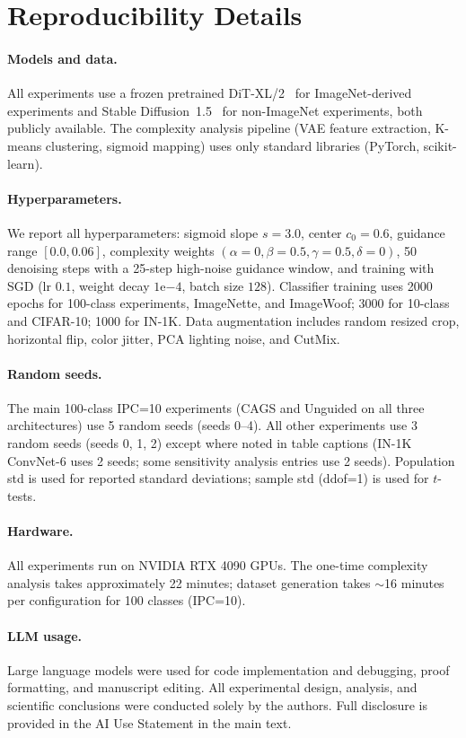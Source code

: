 \section{Reproducibility Details}
\label{sec:reproducibility}

\paragraph{Models and data.}
All experiments use a frozen pretrained DiT-XL/2~\cite{peebles2022scalable} for ImageNet-derived experiments and Stable Diffusion~1.5~\cite{rombach2021highresolution} for non-ImageNet experiments, both publicly available. The complexity analysis pipeline (VAE feature extraction, K-means clustering, sigmoid mapping) uses only standard libraries (PyTorch, scikit-learn).

\paragraph{Hyperparameters.}
We report all hyperparameters: sigmoid slope $s{=}3.0$, center $c_0{=}0.6$, guidance range $[0.0, 0.06]$, complexity weights $(\alpha{=}0, \beta{=}0.5, \gamma{=}0.5, \delta{=}0)$, 50 denoising steps with a 25-step high-noise guidance window, and training with SGD (lr $0.1$, weight decay $1\text{e}{-4}$, batch size $128$). Classifier training uses 2000 epochs for 100-class experiments, ImageNette, and ImageWoof; 3000 for 10-class and CIFAR-10; 1000 for IN-1K. Data augmentation includes random resized crop, horizontal flip, color jitter, PCA lighting noise, and CutMix.

\paragraph{Random seeds.}
The main 100-class IPC=10 experiments (CAGS and Unguided on all three architectures) use 5 random seeds (seeds 0--4). All other experiments use 3 random seeds (seeds 0, 1, 2) except where noted in table captions (IN-1K ConvNet-6 uses 2 seeds; some sensitivity analysis entries use 2 seeds). Population std is used for reported standard deviations; sample std (ddof=1) is used for $t$-tests.

\paragraph{Hardware.}
All experiments run on NVIDIA RTX 4090 GPUs. The one-time complexity analysis takes approximately 22 minutes; dataset generation takes $\sim$16 minutes per configuration for 100 classes (IPC=10).

\paragraph{LLM usage.}
Large language models were used for code implementation and debugging, proof formatting, and manuscript editing. All experimental design, analysis, and scientific conclusions were conducted solely by the authors. Full disclosure is provided in the AI Use Statement in the main text.
